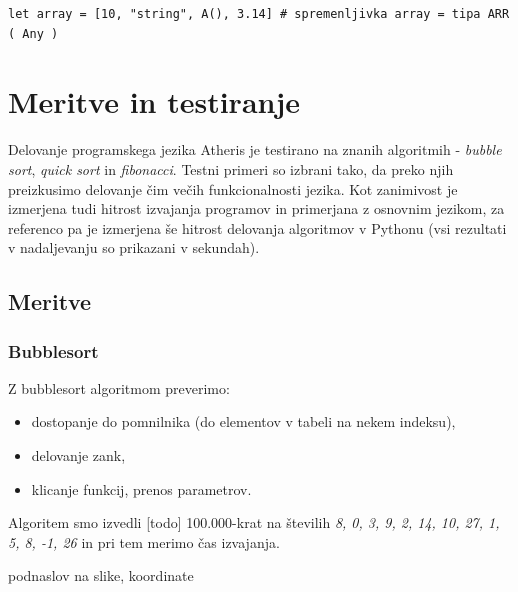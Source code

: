 \documentclass[a4paper, 12p]{book}
\begin{document}
\begin{lstlisting}[caption={Elementi tabele nimajo skupnega tipa.}, captionpos=b]
	let array = [10, "string", A(), 3.14] # spremenljivka array = tipa ARR ( Any )
\end{lstlisting}

\chapter{Meritve in testiranje}

Delovanje programskega jezika Atheris je testirano na znanih algoritmih - \textit{bubble sort}, \textit{quick sort} in \textit{fibonacci}. Testni primeri so izbrani tako, da preko njih preizkusimo delovanje čim večih funkcionalnosti jezika. Kot zanimivost je izmerjena tudi hitrost izvajanja programov in primerjana z osnovnim jezikom, za referenco pa je izmerjena še hitrost delovanja algoritmov v Pythonu (vsi rezultati v nadaljevanju so prikazani v sekundah).

\section{Meritve}

\subsection{Bubblesort}

Z bubblesort algoritmom preverimo:
\vspace{-7mm}
\begin{itemize}
	\setlength\itemsep{-1em}
	\item dostopanje do pomnilnika (do elementov v tabeli na nekem indeksu),
	\item delovanje zank,
	\item klicanje funkcij, prenos parametrov.
\end{itemize}
\vspace{-5mm}
Algoritem smo izvedli [todo] 100.000-krat na številih \textit{8, 0, 3, 9, 2, 14, 10, 27, 1, 5, 8, -1, 26} in pri tem merimo čas izvajanja.

podnaslov na slike, koordinate

\end{document}
